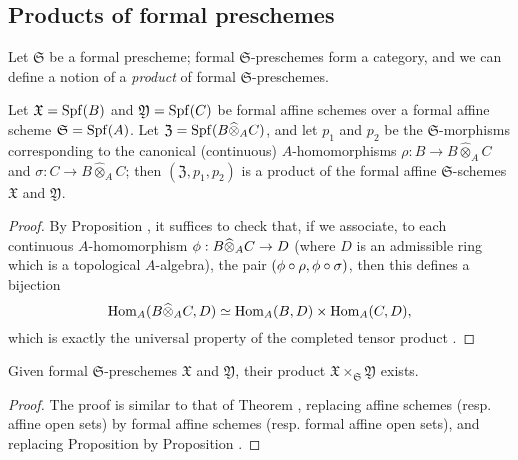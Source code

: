 \subsection{Products of formal preschemes}
\label{subsection:1.10.7}

\begin{env}[10.7.1]
\label{1.10.7.1}
Let $\mathfrak{S}$ be a formal prescheme; formal $\mathfrak{S}$-preschemes form a category, and we can define a notion of a \emph{product} of formal $\mathfrak{S}$-preschemes.
\end{env}

\begin{proposition}[10.7.2]
\label{1.10.7.2}
Let $\mathfrak{X}=\operatorname{Spf}(B)$ and $\mathfrak{Y}=\operatorname{Spf}(C)$ be formal affine schemes over a formal affine scheme $\mathfrak{S}=\operatorname{Spf}(A)$.
Let $\mathfrak{Z}=\operatorname{Spf}(B\widehat{\otimes}_A C)$, and let $p_1$ and $p_2$ be the $\mathfrak{S}$-morphisms corresponding  to the canonical (continuous) $A$-homomorphisms $\rho: B\to B\widehat{\otimes}_A C$ and $\sigma:C\to B\widehat{\otimes}_A C$; then $(\mathfrak{Z},p_1,p_2)$ is a product of the formal affine $\mathfrak{S}$-schemes $\mathfrak{X}$ and $\mathfrak{Y}$.
\end{proposition}

\begin{proof}
\label{proof-1.10.7.2}
By Proposition , it suffices to check that, if we associate, to each continuous $A$-homomorphism $\vphi:B\widehat{\otimes}_A C\to D$ (where $D$ is an admissible ring which is a topological $A$-algebra), the pair $(\phi\circ\rho,\phi\circ\sigma)$, then this defines a bijection
\[
  \operatorname{Hom}_A(B\widehat{\otimes}_A C,D)\simeq\operatorname{Hom}_A(B,D)\times\operatorname{Hom}_A(C,D),
\]
which is exactly the universal property of the completed tensor product .
\end{proof}

\begin{proposition}[10.7.3]
\label{1.10.7.3}
Given formal $\mathfrak{S}$-preschemes $\mathfrak{X}$ and $\mathfrak{Y}$, their product $\mathfrak{X}\times_\mathfrak{S}\mathfrak{Y}$ exists.
\end{proposition}

\begin{proof}
\label{proof-1.10.7.3}
The proof is similar to that of Theorem , replacing affine schemes (resp. affine open sets) by formal affine schemes (resp. formal affine open sets), and replacing Proposition  by Proposition .
\end{proof}

